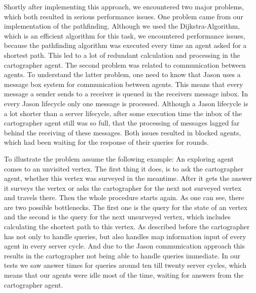 Shortly after implementing this approach, we encountered two major problems, which both resulted in serious performance issues.
One problem came from our implementation of the pathfinding.
Although we used the Dijkstra-Algorithm, which is an efficient algorithm for this task, we encountered performance issues, because the pathfinding algorithm was executed every time an agent asked for a shortest path.
This led to a lot of redundant calculation and processing in the cartographer agent.
The second problem was related to communication between agents.
To understand the latter problem, one need to know that Jason uses a message box system for communication between agents.
This means that every message a sender sends to a receiver is queued in the receivers message inbox.
In every Jason lifecycle only one message is processed.
Although a Jason lifecycle is a lot shorter than a server lifecycle, after some execution time the inbox of the cartographer agent still was so full, that the processing of messages lagged far behind the receiving of these messages.
Both issues resulted in blocked agents, which had been waiting for the response of their queries for rounds.

To illustrate the problem assume the following example: An exploring agent comes to an unvisited vertex.
The first thing it does, is to ask the cartographer agent, whether this vertex was surveyed in the meantime.
After it gets the answer it surveys the vertex or asks the cartographer for the next not surveyed vertex and travels there.
Then the whole procedure starts again.
As one can see, there are two possible bottlenecks.
The first one is the query for the state of an vertex and the second is the query for the next unsurveyed vertex, which includes calculating the shortest path to this vertex.
As described before the cartographer has not only to handle queries, but also handles map information input of every agent in every server cycle.
And due to the Jason communication approach this results in the cartographer not being able to handle queries immediate.
In our tests we saw answer times for queries around ten till twenty server cycles, which means that our agents were idle most of the time, waiting for answers from the cartographer agent.

